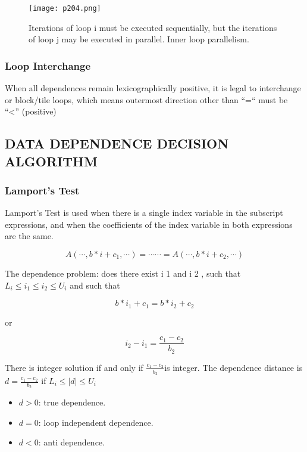 \begin{figure}[H]
	\centering
	\texttt{[image: p204.png]}
	\caption{Iterations of loop i must be executed sequentially, but the
		iterations of loop j may be executed in parallel. Inner loop parallelism.}
	\label{fig:p204}
\end{figure}

\subsubsection{Loop Interchange}

When all dependences remain lexicographically positive,
it is legal to interchange or block/tile loops, which means
outermost direction other than “=“ must be “<” (positive)



\subsection{DATA DEPENDENCE DECISION ALGORITHM}


\subsubsection{Lamport's Test}

Lamport’s Test is used when there is a single index variable
in the subscript expressions, and when the coefficients of
the index variable in both expressions are the same.

\[
	A(    \cdots    , b * i + c_1 ,    \cdots    ) =    \cdots
	\cdots    = A(    \cdots    , b * i + c_2 ,    \cdots    )
\]


The dependence problem: does there exist i 1 and i 2 , such
that \(L_i \leq i_1 \leq i_2 \leq U_i \) and such that


\[
	b * i_1 + c_1  =  b * i_2 + c_2
\]

or

\[
	i_2 - i _1 = \frac{c_1-c_2}{b_2}
\]

There is integer solution if and only if \( \frac{c_1-c_2}{b_2}  \)is integer.
The dependence distance is \( d =  \frac{c_1-c_2}{b_2}  \) if \( L_i \leq |d| \leq U_i \)

\begin{itemize}

	\item 	$d > 0$:  true dependence.
	\item 	$d = 0$:  loop independent dependence.
	\item 	$d < 0$:  anti dependence.
\end{itemize}


